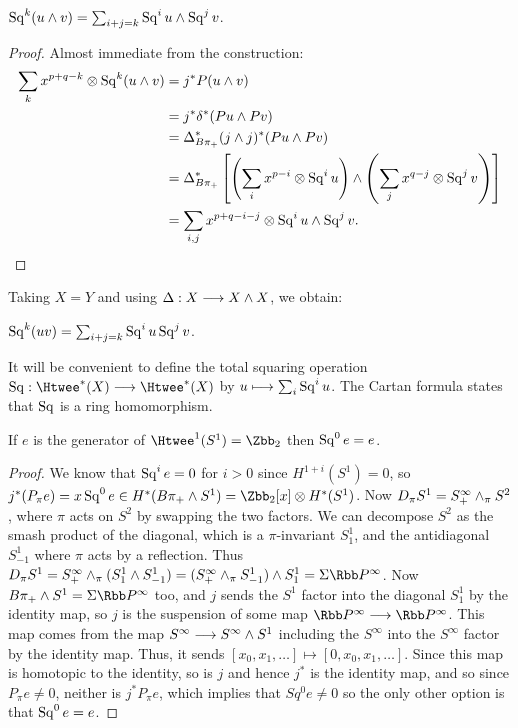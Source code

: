 \begin{cor}
$\operatorname{Sq}^k(u \wedge v) = \sum_{i+j = k} \operatorname{Sq}^i u \wedge \operatorname{Sq}^j v$.
\end{cor}
%
\begin{proof}
Almost immediate from the construction:
\begin{align*}
\sum_k x^{p+q-k} \otimes \Sq^k(u \sprod v) & = j^* P(u \sprod v) \\
& = j^* \delta^*(Pu \sprod Pv) \\
& = \Delta_{B \pi_+}^* (j \sprod j)^*(Pu \sprod Pv) \\
& = \Delta_{B \pi_+}^*\left[\left(\sum_i x^{p-i} \otimes \Sq^i u\right) \sprod \left(\sum_j x^{q-j} \otimes \Sq^j v\right)\right] \\ %
& = \sum_{i, j}x^{p+q-i-j} \otimes \Sq^i u \sprod \Sq^j v.\qedhere
\end{align*}
\end{proof}
\noindent
Taking $X = Y$ and using $\Delta: X \longrightarrow X \wedge X$, we obtain:
\begin{cor}
$\operatorname{Sq}^k(uv) = \sum_{i+j=k} \operatorname{Sq}^i u \operatorname{Sq}^j v$.
\end{cor}
\noindent It will be convenient to define the total squaring operation $\Sq:\Htwee^*(X)\to\Htwee^*(X)$ by $ u\longmapsto\sum_i \operatorname{Sq}^i u$. The Cartan formula states that $\operatorname{Sq}$ is a ring homomorphism.

\begin{lem}
If $e$ is the generator of $\Htwee^1 (S^1) = \Zbb_2$ then $\operatorname{Sq}^0 e = e$.
\end{lem}

\begin{proof}
We know that $\operatorname{Sq}^i e = 0$ for $i>0$ since $H^{1+i}(S^1)=0$, so $j^*(P_{\pi}e)=x\Sq^0 e \in H^*(B\pi_+ \sprod S^1)=\Zbb_2[x]\otimes H^*(S^1)$.  Now $D_{\pi}S^1 = S^{\infty}_+\wedge_{\pi} S^2$, where $\pi$ acts on $S^2$ by swapping the two factors.  We can decompose $S^2$ as the smash product of the diagonal, which is a $\pi$-invariant $S^1_1$, and the antidiagonal $S^1_{-1}$ where $\pi$ acts by a reflection.  Thus $D_{\pi} S^1 = S^{\infty}_+ \sprod_\pi (S^1_1 \sprod S^1_{-1}) = (S^{\infty}_+\sprod_{\pi} S^1_{-1}) \sprod S^1_1 = \Sigma \RP^{\infty}$.  Now $B\pi_+\sprod S^1=\Sigma \RP^{\infty}$ too, and $j$ sends the $S^1$ factor into the diagonal $S^1_1$ by the identity map, so $j$ is the suspension of some map $\RP^{\infty}\to\RP^{\infty}$.  This map comes from the map $S^{\infty}\longrightarrow S^{\infty}\wedge S^1$ including the $S^{\infty}$ into the $S^{\infty}$ factor by the identity map.  Thus, it sends $[x_0,x_1,\ldots]\mapsto [0,x_0,x_1,\ldots]$.  Since this map is homotopic to the identity, so is $j$ and hence $j^*$ is the identity map, and so since $P_\pi e\neq 0$, neither is $j^*P_{\pi}e$, which implies that $Sq^0e\neq 0$ so the only other option is that $\operatorname{Sq}^0 e = e$.
\end{proof}

